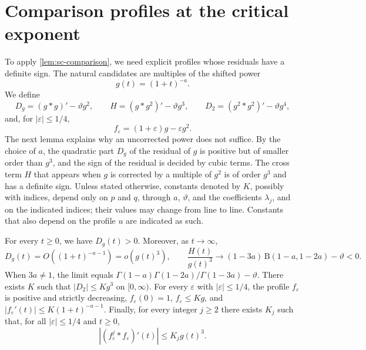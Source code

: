 \section{Comparison profiles at the critical exponent}
\label{subsec:sc-endpoint}

To apply \cref{lem:sc-comparison}, we need explicit profiles whose residuals have a definite sign. The natural candidates are multiples of the shifted power
\[
 g(t)=(1+t)^{-a}.
\]
We define
\[
 D_g=(g*g)'-\vartheta g^2,\qquad
 H=(g*g^2)'-\vartheta g^3,\qquad
 D_2=(g^2*g^2)'-\vartheta g^4,
\]
and, for $|\varepsilon|\le1/4$,
\[
 f_\varepsilon=(1+\varepsilon)g-\varepsilon g^2 .
\]
The next lemma explains why an uncorrected power does not suffice. By the choice of $a$, the quadratic part $D_g$ of the residual of $g$ is positive but of smaller order than $g^3$, and the sign of the residual is decided by cubic terms. The cross term $H$ that appears when $g$ is corrected by a multiple of $g^2$ is of order $g^3$ and has a definite sign. Unless stated otherwise, constants denoted by $K$, possibly with indices, depend only on $p$ and $q$, through $a$, $\vartheta$, and the coefficients $\lambda_j$, and on the indicated indices; their values may change from line to line. Constants that also depend on the profile $u$ are indicated as such.

\begin{lemma}
\label{lem:sc-shifted}
For every $t\ge0$, we have $D_g(t)>0$. Moreover, as $t\to\infty$,
\begin{equation}
 D_g(t)=O((1+t)^{-a-1})=o(g(t)^3),\qquad
 \frac{H(t)}{g(t)^3}\longrightarrow
 (1-3a)\,\mathrm B(1-a,1-2a)-\vartheta<0.
 \label{eq:sc-shifted-limits}
\end{equation}
When $3a\ne1$, the limit equals $\Gamma(1-a)\Gamma(1-2a)/\Gamma(1-3a)-\vartheta$. There exists $K$ such that $|D_2|\le Kg^3$ on $[0,\infty)$. For every $\varepsilon$ with $|\varepsilon|\le1/4$, the profile $f_\varepsilon$ is positive and strictly decreasing, $f_\varepsilon(0)=1$, $f_\varepsilon\le Kg$, and $|f_\varepsilon'(t)|\le K(1+t)^{-a-1}$. Finally, for every integer $j\ge2$ there exists $K_j$ such that, for all $|\varepsilon|\le1/4$ and $t\ge0$,
\begin{equation}
 |(f_\varepsilon^j*f_\varepsilon)'(t)|\le K_jg(t)^3 .
 \label{eq:sc-shifted-derivative}
\end{equation}
\end{lemma}


